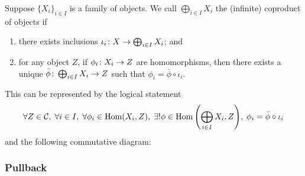 \begin{definition}
    Suppose \({\{X_i\}}_{i \in I}\) is a family of objects.
    We call \(\bigoplus_{i \in I} X_i\) the (infinite) coproduct of objects if
    \begin{enumerate}[label={(\roman*)}, itemsep=0mm]
        \item there exists inclusions \(\iota_i\colon X\to\bigoplus_{i \in I} X_i\); and
        \item for any object \(Z\),
            if \(\phi_i\colon X_i\to Z\) are homomorphisms,
            then there exists a unique \(\bar{\phi}\colon\bigoplus_{i \in I} X_i\to Z\)
            such that \(\phi_i = \bar{\phi}\circ\iota_i\).
    \end{enumerate}

    This can be represented by the logical statement
    \begin{equation*}
        \forall Z \in \mca{C},\;
        \forall i \in I,\;
        \forall \phi_i \in \Hom(X_i,Z),\;
        \exists! \phi \in \Hom\pqty{\bigoplus_{i \in I} X_i, Z},\;
        \phi_i = \bar{\phi}\circ\iota_i
    \end{equation*}
    and the following commutative diagram:
    \begin{center}
    \end{center}
\end{definition}

\subsubsection*{Pullback}


